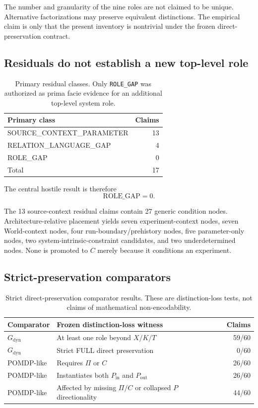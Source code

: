 \documentclass[11pt]{article}
\newcommand{\Pin}{P_{\mathrm{in}}}
\newcommand{\Pout}{P_{\mathrm{out}}}
\begin{document}
The number and granularity of the nine roles are not claimed to be unique. Alternative factorizations may preserve equivalent distinctions. The empirical claim is only that the present inventory is nontrivial under the frozen direct-preservation contract.

\subsection{Residuals do not establish a new top-level role}

\begin{table}[htbp]
\centering
\caption{Primary residual classes. Only \texttt{ROLE\_GAP} was authorized as prima facie evidence for an additional top-level system role.}
\label{tab:residuals}
\begin{tabular}{lr}
\toprule
Primary class & Claims \\
\midrule
SOURCE\_CONTEXT\_PARAMETER & 13 \\
RELATION\_LANGUAGE\_GAP & 4 \\
ROLE\_GAP & 0 \\
\midrule
Total & 17 \\
\bottomrule
\end{tabular}
\end{table}

The central hostile result is therefore
\[
\boxed{\mathrm{ROLE\_GAP}=0}.
\]

The 13 source-context residual claims contain 27 generic condition nodes. Architecture-relative placement yields seven experiment-context nodes, seven World-context nodes, four run-boundary/prehistory nodes, five parameter-only nodes, two system-intrinsic-constraint candidates, and two underdetermined nodes. None is promoted to \(C\) merely because it conditions an experiment.

\subsection{Strict-preservation comparators}

\begin{table}[htbp]
\centering
\caption{Strict direct-preservation comparator results. These are distinction-loss tests, not claims of mathematical non-encodability.}
\label{tab:comparators}
\begin{tabularx}{\textwidth}{>{\raggedright\arraybackslash}p{} >{\raggedright\arraybackslash}X r}
\toprule
Comparator & Frozen distinction-loss witness & Claims \\
\midrule
\(G_{\mathrm{dyn}}\) & At least one role beyond \(X/K/T\) & 59/60 \\
\(G_{\mathrm{dyn}}\) & Strict FULL direct preservation & 0/60 \\
POMDP-like & Requires \(\Pi\) or \(C\) & 26/60 \\
POMDP-like & Instantiates both \(\Pin\) and \(\Pout\) & 26/60 \\
POMDP-like & Affected by missing \(\Pi/C\) or collapsed \(P\) directionality & 44/60 \\
\bottomrule
\end{tabularx}
\end{table}
\end{document}
